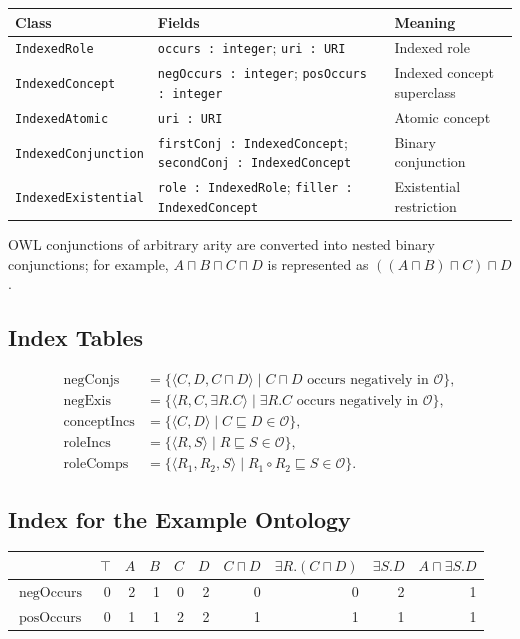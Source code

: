 \documentclass[11pt]{article}
\newcommand{\Ont}{\mathcal O}
\newcommand{\sub}{\sqsubseteq}
\newcommand{\compose}{\circ}
\newcommand{\occursNeg}{\operatorname{negOccurs}}
\newcommand{\occursPos}{\operatorname{posOccurs}}
\newcommand{\negConjs}{\operatorname{negConjs}}
\newcommand{\negExis}{\operatorname{negExis}}
\newcommand{\conceptIncs}{\operatorname{conceptIncs}}
\newcommand{\roleIncs}{\operatorname{roleIncs}}
\newcommand{\roleComps}{\operatorname{roleComps}}
\begin{document}
\begin{center}
\begin{tabular}{lll}
\toprule
\textbf{Class} & \textbf{Fields} & \textbf{Meaning} \\
\midrule
\texttt{IndexedRole} & \texttt{occurs : integer}; \texttt{uri : URI} & Indexed role \\
\texttt{IndexedConcept} & \texttt{negOccurs : integer}; \texttt{posOccurs : integer} & Indexed concept superclass \\
\texttt{IndexedAtomic} & \texttt{uri : URI} & Atomic concept \\
\texttt{IndexedConjunction} & \texttt{firstConj : IndexedConcept}; \texttt{secondConj : IndexedConcept} & Binary conjunction \\
\texttt{IndexedExistential} & \texttt{role : IndexedRole}; \texttt{filler : IndexedConcept} & Existential restriction \\
\bottomrule
\end{tabular}
\end{center}

OWL conjunctions of arbitrary arity are converted into nested binary conjunctions; for example, $A \sqcap B \sqcap C \sqcap D$ is represented as $((A \sqcap B) \sqcap C) \sqcap D$.

\subsection{Index Tables}

\begin{align*}
\negConjs &= \{\langle C,D,C \sqcap D\rangle \mid C \sqcap D \text{ occurs negatively in } \Ont\},\\
\negExis &= \{\langle R,C,\exists R.C\rangle \mid \exists R.C \text{ occurs negatively in } \Ont\},\\
\conceptIncs &= \{\langle C,D\rangle \mid C \sub D \in \Ont\},\\
\roleIncs &= \{\langle R,S\rangle \mid R \sub S \in \Ont\},\\
\roleComps &= \{\langle R_1,R_2,S\rangle \mid R_1 \compose R_2 \sub S \in \Ont\}.
\end{align*}

\subsection{Index for the Example Ontology}

\begin{center}
\begin{tabular}{lrrrrrrrrr}
\toprule
& $\top$ & $A$ & $B$ & $C$ & $D$ & $C\sqcap D$ & $\exists R.(C\sqcap D)$ & $\exists S.D$ & $A\sqcap \exists S.D$ \\
\midrule
$\occursNeg$ & 0 & 2 & 1 & 0 & 2 & 0 & 0 & 2 & 1 \\
$\occursPos$ & 0 & 1 & 1 & 2 & 2 & 1 & 1 & 1 & 1 \\
\bottomrule
\end{tabular}
\end{center}
\end{document}
